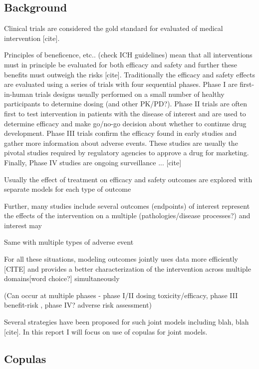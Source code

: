 \subsection*{Background}

Clinical trials are considered the gold standard for evaluated of medical intervention [cite].

Principles of beneficence, etc.. (check ICH guidelines) mean that all interventions must in principle be evaluated for both efficacy and safety and further these benefits must outweigh the risks [cite]. Traditionally the efficacy and safety effects are evaluated using a series of trials with four sequential phases. Phase I are first-in-human trials designs usually performed on a small number of healthy participants to determine dosing (and other PK/PD?). Phase II trials are often first to test intervention in patients with the disease of interest and are used to determine efficacy and make go/no-go decision about whether to continue drug development. Phase III trials confirm the efficacy found in early studies and gather more information about adverse events. These studies are usually the pivotal studies required by regulatory agencies to approve a drug for marketing. Finally, Phase IV studies are ongoing surveillance ... [cite]

Usually the effect of treatment on efficacy and safety outcomes are explored with separate models for each type of outcome

Further, many studies include several outcomes (endpoints) of interest represent the effects of the intervention on a multiple (pathologies/disease processes?) and interest may

Same with multiple types of adverse event

For all these situations, modeling outcomes jointly uses data more efficiently [CITE] and provides a better characterization of the intervention across multiple domains[word choice?] simultaneously

(Can occur at multiple phases - phase I/II dosing toxicity/efficacy, phase III benefit-risk , phase IV? adverse risk assessment)

Several strategies have been proposed for such joint models including blah, blah [cite]. In this report I will focus on use of copulas for joint  models\cite{costa_bayesian_2018}. 
 
\subsection*{Copulas} %


